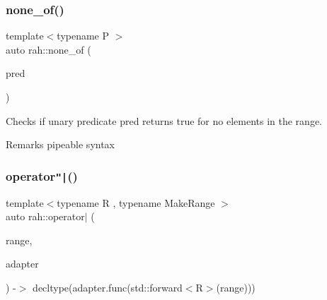 \subsubsection{\texorpdfstring{none\_of()}{none\_of()}\hspace{0.1cm}{\footnotesize\ttfamily [2/2]}}
{\footnotesize\ttfamily template$<$typename P $>$ \\
auto rah\+::none\+\_\+of (\begin{DoxyParamCaption}\item[{P \&\&}]{pred }\end{DoxyParamCaption})}



Checks if unary predicate pred returns true for no elements in the range. 

\begin{DoxyRemark}{Remarks}
pipeable syntax
\end{DoxyRemark}

\begin{DoxyCodeInclude}{0}
\DoxyCodeLine{        ) == \textcolor{keyword}{false});}
\end{DoxyCodeInclude}
\mbox{\label{namespacerah_a5ebb23bb276c853ef14a86bed84b6df9}} 
\subsubsection{\texorpdfstring{operator\texttt{"|}()}{operator|()}}
{\footnotesize\ttfamily template$<$typename R , typename Make\+Range $>$ \\
auto rah\+::operator$\vert$ (\begin{DoxyParamCaption}\item[{R \&\&}]{range,  }\item[{\mbox{\hyperlink{structrah_1_1pipeable}{pipeable}}$<$ Make\+Range $>$ const \&}]{adapter }\end{DoxyParamCaption}) -\/$>$ decltype(adapter.\+func(std\+::forward$<$R$>$(range)))
}

\mbox{\label{namespacerah_a407b50a4f029e3f2a3cd0ba9142aea84}} 
